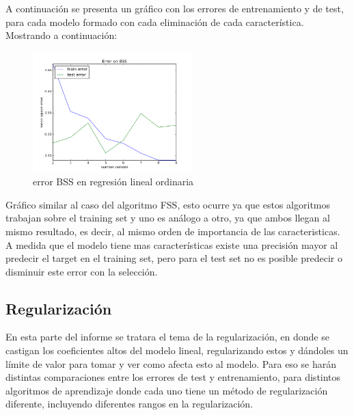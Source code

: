 \documentclass[10pt]{article}
\begin{document}
\begin{itemize}
A continuación se presenta un gráfico con los errores de entrenamiento y de test, para cada modelo formado con cada eliminación de cada característica. Mostrando a continuación:

\begin	{figure}[h]
    \centering
    \includegraphics[width=0.55\textwidth]{images/bss}
    \caption{error BSS en regresión lineal ordinaria}
    \label{fig:mesh1}
\end{figure}
\end{itemize}

Gráfico similar al caso del algoritmo FSS, esto ocurre ya que estos algoritmos trabajan sobre el training set y uno es análogo a otro, ya que ambos llegan al mismo resultado, es decir, al mismo orden de importancia de las caracteristicas. A medida que el modelo tiene mas características existe una precisión mayor al predecir el target en el training set, pero para el test set no es posible predecir o disminuir este error con la selección.\\

\subsection{Regularización}

En esta parte del informe se tratara el tema de la regularización, en donde se castigan los coeficientes altos del modelo lineal, regularizando estos y dándoles un límite de valor para tomar y ver como afecta esto al modelo. Para eso se harán distintas comparaciones entre los errores de test y entrenamiento, para distintos algoritmos de aprendizaje donde cada uno tiene un método de regularización diferente, incluyendo diferentes rangos en la regularización.
 
\end{document}
